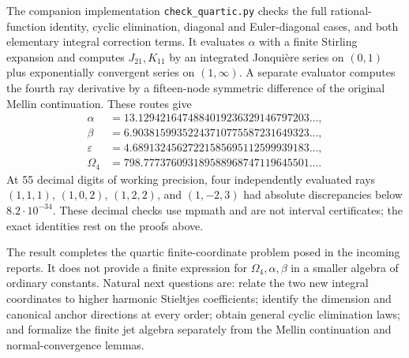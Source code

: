 The companion implementation \texttt{check\_quartic.py} checks
the full rational-function identity, cyclic elimination, diagonal and
Euler-diagonal cases, and both elementary integral correction terms.
It evaluates $\alpha$ with a finite Stirling expansion and computes
$J_{21},K_{11}$ by an integrated Jonqui\`ere series on $(0,1)$ plus
exponentially convergent series on $(1,\infty)$. A separate evaluator
computes the fourth ray derivative by a fifteen-node symmetric
difference of the original Mellin continuation. These routes give
\begin{align*}
 \alpha&=13.1294216474884019236329146797203\ldots,\\
 \beta&=6.90381599352243710775587231649323\ldots,\\
 \varepsilon&=4.68913245627221585695112599939183\ldots,\\
 \Omega_4&=798.777376093189588968747119645501\ldots.
\end{align*}
At 55 decimal digits of working precision, four independently evaluated
rays $(1,1,1)$, $(1,0,2)$, $(1,2,2)$, and $(1,-2,3)$ had absolute discrepancies
below $8.2\cdot10^{-34}$. These decimal checks use mpmath and are not
interval certificates; the exact identities rest on the proofs above.

The result completes the quartic finite-coordinate problem posed in the
incoming reports. It does not provide a finite expression for
$\Omega_4,\alpha,\beta$ in a smaller algebra of ordinary constants.
Natural next questions are: relate the two new integral coordinates to
higher harmonic Stieltjes coefficients; identify the dimension and
canonical anchor directions at every order; obtain general cyclic
elimination laws; and formalize the finite jet algebra separately from
the Mellin continuation and normal-convergence lemmas.

